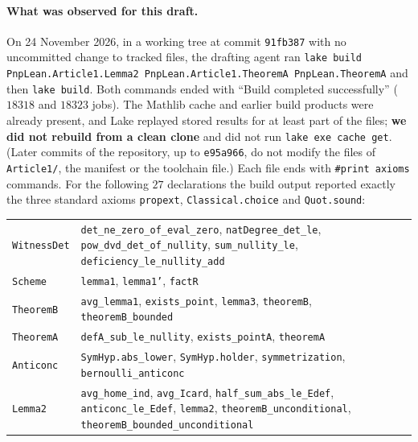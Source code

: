 \documentclass[11pt,a4paper]{article}
\theoremstyle{definition}
\theoremstyle{remark}
\begin{document}
\paragraph{What was observed for this draft.} On 24 November 2026, in a working tree at
commit \texttt{91fb387} with no uncommitted change to tracked files, the drafting agent ran
\texttt{lake build PnpLean.Article1.Lemma2 PnpLean.Article1.TheoremA PnpLean.TheoremA} and
then \texttt{lake build}. Both commands ended with ``Build completed successfully'' ($18318$
and $18323$ jobs). The Mathlib cache and earlier build products were already present, and
Lake replayed stored results for at least part of the files; \textbf{we did not rebuild from
a clean clone} and did not run \texttt{lake exe cache get}. (Later commits of the repository, up to \texttt{e95a966}, do not modify
the files of \texttt{Article1/}, the manifest or the toolchain file.) Each file ends with
\texttt{\#print axioms} commands. For the following $27$ declarations the build output
reported exactly the three standard axioms \texttt{propext}, \texttt{Classical.choice} and
\texttt{Quot.sound}:
\begin{center}
\small
\begin{tabular}{@{}>{\raggedright\arraybackslash}p{2.3cm}>{\raggedright\arraybackslash}p{12.6cm}@{}}
\texttt{WitnessDet} & \texttt{det\_ne\_zero\_of\_eval\_zero}, \texttt{natDegree\_det\_le},
 \texttt{pow\_dvd\_det\_of\_nullity}, \texttt{sum\_nullity\_le},
 \texttt{deficiency\_le\_nullity\_add}\\
\texttt{Scheme} & \texttt{lemma1}, \texttt{lemma1'}, \texttt{factR}\\
\texttt{TheoremB} & \texttt{avg\_lemma1}, \texttt{exists\_point}, \texttt{lemma3},
 \texttt{theoremB}, \texttt{theoremB\_bounded}\\
\texttt{TheoremA} & \texttt{defA\_sub\_le\_nullity}, \texttt{exists\_pointA},
 \texttt{theoremA}\\
\texttt{Anticonc} & \texttt{SymHyp.abs\_lower}, \texttt{SymHyp.holder},
 \texttt{symmetrization}, \texttt{bernoulli\_anticonc}\\
\texttt{Lemma2} & \texttt{avg\_home\_ind}, \texttt{avg\_Icard},
 \texttt{half\_sum\_abs\_le\_Edef}, \texttt{anticonc\_le\_Edef}, \texttt{lemma2},
 \texttt{theoremB\_unconditional}, \texttt{theoremB\_bounded\_\allowbreak unconditional}
\end{tabular}
\end{center}
\end{document}
